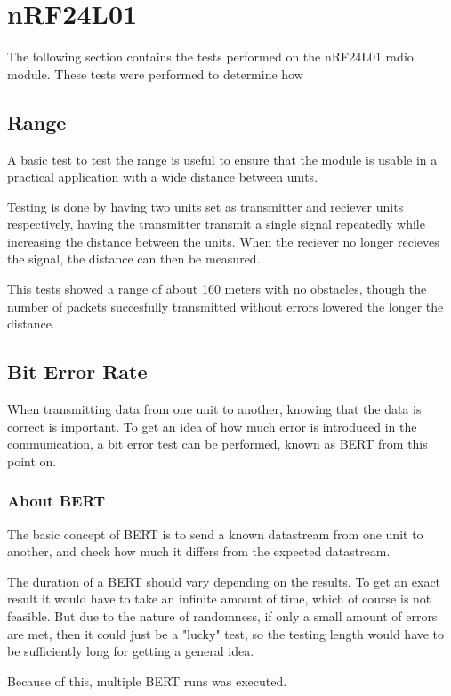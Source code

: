 \section{nRF24L01}
The following section contains the tests performed on the nRF24L01 radio module. These tests were performed to determine how 

\subsection{Range}
A basic test to test the range is useful to ensure that the module is usable in a practical application with a wide distance between units.

Testing is done by having two units set as transmitter and reciever units respectively, having the transmitter transmit a single signal repeatedly while increasing the distance between the units. When the reciever no longer recieves the signal, the distance can then be measured.

This tests showed a range of about 160 meters with no obstacles, though the number of packets succesfully transmitted without errors lowered the longer the distance.

\subsection{Bit Error Rate}
When transmitting data from one unit to another, knowing that the data is correct is important. To get an idea of how much error is introduced in the communication, a bit error test can be performed, known as BERT from this point on.

\subsubsection*{About BERT}

The basic concept of BERT is to send a known datastream from one unit to another, and check how much it differs from the expected datastream.

The duration of a BERT should vary depending on the results. To get an exact result it would have to take an infinite amount of time, which of course is not feasible. But due to the nature of randomness, if only a small amount of errors are met, then it could just be a "lucky" test, so the testing length would have to be sufficiently long for getting a general idea.

Because of this, multiple BERT runs was executed.

